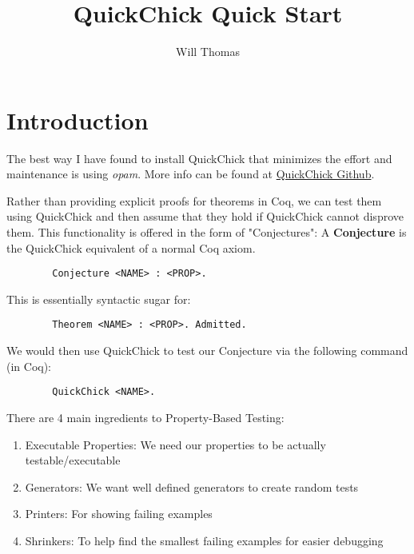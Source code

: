 \documentclass{article}
\title{\textbf{QuickChick Quick Start}}
\author{Will Thomas}
\begin{document}
    \maketitle

    \section{Introduction}
    The best way I have found to install QuickChick that minimizes the effort and maintenance is using \emph{opam}. More info can be found at \href{https://github.com/QuickChick/QuickChick#installation}{QuickChick Github}.

    Rather than providing explicit proofs for theorems in Coq, we can test them using QuickChick and then assume that they hold if QuickChick cannot disprove them. This functionality is offered in the form of "Conjectures": 
    A \textbf{Conjecture} is the QuickChick equivalent of a normal Coq axiom.
    \begin{verbatim}
        Conjecture <NAME> : <PROP>.
    \end{verbatim}
    This is essentially syntactic sugar for:
    \begin{verbatim}
        Theorem <NAME> : <PROP>. Admitted.
    \end{verbatim}
    We would then use QuickChick to test our Conjecture via the following command (in Coq):
    \begin{verbatim}
        QuickChick <NAME>.
    \end{verbatim}
    There are 4 main ingredients to Property-Based Testing:
    \begin{enumerate}
        \item Executable Properties: We need our properties to be actually testable/executable
        \item Generators: We want well defined generators to create random tests
        \item Printers: For showing failing examples
        \item Shrinkers: To help find the smallest failing examples for easier debugging
    \end{enumerate}
\end{document}
